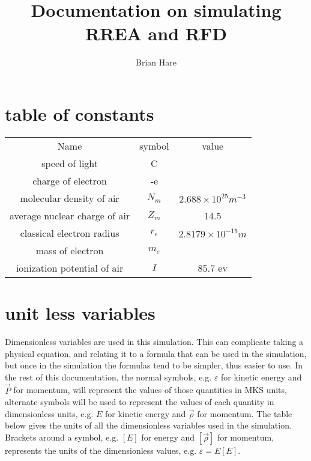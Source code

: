 \documentclass[]{article}
\title{Documentation on simulating RREA and RFD}
\author{Brian Hare}
\begin{document}
\maketitle



\section{table of constants}

\begin{center}
	\begin{tabular}{ c c c }
		Name                          & symbol    &   value  \\ 
		speed of light                & C         &         \\  
		charge of electron            & -e        &         \\  
		molecular density of air      & $N_m$     &   $2.688\times 10^{25} m^{-3} $     \\  
		average nuclear charge of air & $Z_m$     &  14.5       \\  
		classical electron radius     & $r_e$     &   $2.8179\times 10^{-15} m $      \\  
        mass of electron              & $m_e$     &     \\
        ionization potential of air   & $I$       &  85.7 ev    \\  
	\end{tabular}
\end{center}


\section{unit less variables}

Dimensionless variables are used in this simulation. This can complicate taking a physical equation, and relating it to a formula that can be used in the simulation, but once in the simulation the formulas tend to be simpler, thus easier to use. In the rest of this documentation, the normal symbols, e.g. $\varepsilon$ for kinetic energy and $ \vec{P} $ for momentum, will represent the values of those quantities in MKS units, alternate symbols will be used to represent the values of each quantity in dimensionless units, e.g. $E$ for kinetic energy and $\vec{\rho} $ for momentum. The table below gives the units of all the dimensionless variables used in the simulation. Brackets around a symbol, e.g.  $\left[ E\right] $ for energy and $\left[  \vec{\rho} \right] $ for momentum, represents the units of the dimensionless values, e.g. $\varepsilon = E \left[ E \right] $.
\end{document}
